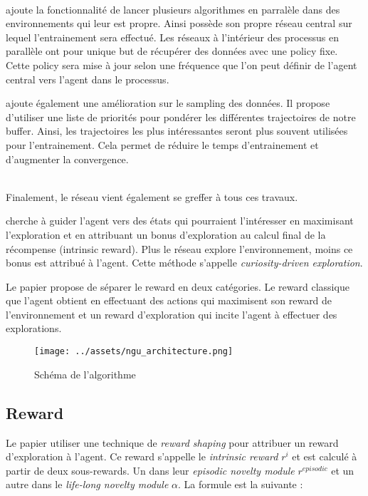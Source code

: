 ~\\
 ajoute la fonctionnalité de lancer plusieurs algorithmes  en parralèle dans des environnements qui leur est propre. Ainsi  possède son propre réseau central  sur lequel l'entrainement sera effectué. Les réseaux à l'intérieur des processus en parallèle ont pour unique but de récupérer des données avec une policy fixe. Cette policy sera mise à jour selon une fréquence que l'on peut définir de l'agent central vers l'agent dans le processus.

 ajoute également une amélioration sur le sampling des données. Il propose d'utiliser une liste de priorités pour pondérer les différentes trajectoires de notre buffer. Ainsi, les trajectoires les plus intéressantes seront plus souvent utilisées pour l'entrainement. Cela permet de réduire le temps d'entrainement et d'augmenter la convergence.

~\\
Finalement, le réseau  vient également se greffer à tous ces travaux.

 cherche à guider l'agent vers des états qui pourraient l'intéresser en maximisant l'exploration et en attribuant un bonus d'exploration au calcul final de la récompense (intrinsic reward). Plus le réseau explore l'environnement, moins ce bonus est attribué à l'agent. Cette méthode s'appelle \textit{curiosity-driven exploration}.

Le papier propose de séparer le reward en deux catégories. Le reward classique que l'agent obtient en effectuant des actions qui maximisent son reward de l'environnement et un reward d'exploration qui incite l'agent à effectuer des explorations.


\begin{figure}[H]
    \centering
    \texttt{[image: ../assets/ngu\_architecture.png]}
    \caption{Schéma de l'algorithme }
\end{figure}

\subsection{Reward}

Le papier utiliser une technique de \textit{reward shaping} pour attribuer un reward d'exploration à l'agent. Ce reward s'appelle le \textit{intrinsic reward} $r^i$ et est calculé à partir de deux sous-rewards. Un dans leur \textit{episodic novelty module} $r^{episodic}$ et un autre dans le \textit{life-long novelty module} $\alpha$. La formule est la suivante :

